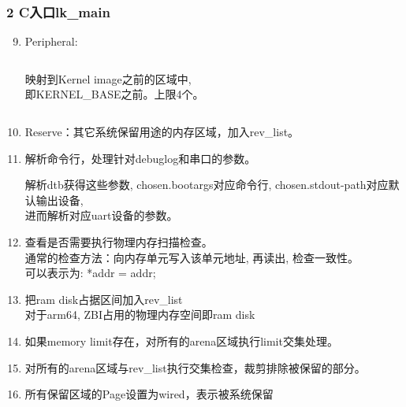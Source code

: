 \documentclass[
8pt, %
]{beamer}
\begin{document}
	\begin{frame}
		\frametitle{2 C入口lk\_main}
		\begin{enumerate}\setcounter{enumi}{8}
			\item Peripheral:
            \begin{columns}[c]
                \begin{column}{0.5\textwidth}
                    \begin{center}
                        映射到Kernel image之前的区域中, \\
                        即KERNEL\_BASE之前。上限4个。
                    \end{center}
                \end{column}
                \begin{column}{0.45\textwidth}
                \end{column}
            \end{columns}
			\item Reserve：其它系统保留用途的内存区域，加入rev\_list。
			\item 解析命令行，处理针对debuglog和串口的参数。
			\begin{block}{}
				解析dtb获得这些参数, chosen.bootargs对应命令行, chosen.stdout-path对应默认输出设备, \\
                进而解析对应uart设备的参数。
			\end{block}
            \item 查看是否需要执行物理内存扫描检查。\\
            通常的检查方法：向内存单元写入该单元地址, 再读出, 检查一致性。\\
            可以表示为: *addr = addr;
			\item 把ram disk占据区间加入rev\_list\\
            对于arm64, ZBI占用的物理内存空间即ram disk
			\item 如果memory limit存在，对所有的arena区域执行limit交集处理。
			\item 对所有的arena区域与rev\_list执行交集检查，裁剪排除被保留的部分。
			\item 所有保留区域的Page设置为wired，表示被系统保留
		\end{enumerate}
	\end{frame}
\end{document}
